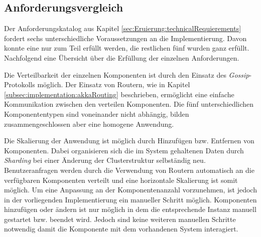 \subsection{Anforderungsvergleich}
Der Anforderungskatalog aus Kapitel \ref{sec:Eruierung:technicalRequierements} fordert sechs unterschiedliche Voraussetzungen an die Implementierung. Davon konnte eine nur zum Teil erfüllt werden, die restlichen fünf wurden ganz erfüllt. \\
Nachfolgend eine Übersicht über die Erfüllung der einzelnen Anforderungen.
\begin{enumerate}
    Die Verteilbarkeit der einzelnen Komponenten ist durch den Einsatz des \textit{Gossip}-Protokolls möglich. Der Einsatz von Routern, wie in Kapitel \ref{subsec:implementation:akkaRouting} beschrieben, ermöglicht eine einfache Kommunikation  zwischen den verteilen Komponenten. Die fünf unterschiedlichen Komponententypen sind voneinander nicht abhängig, bilden zusammengeschlossen aber eine homogene Anwendung.

    Die Skalierung der Anwendung ist möglich durch Hinzufügen bzw. Entfernen von Komponenten. Dabei organisieren sich die im System gehaltenen Daten durch \textit{Sharding} bei einer Änderung der Clusterstruktur selbständig neu. Benutzeranfragen werden durch die Verwendung von Routern automatisch an die verfügbaren Komponenten verteilt und eine horizontale Skalierung ist somit möglich. Um eine Anpassung an der Komponentenanzahl vorzunehmen, ist jedoch in der vorliegenden Implementierung ein manueller Schritt möglich. Komponenten hinzufügen oder ändern ist nur möglich in dem die entsprechende Instanz manuell gestartet bzw. beendet wird. Jedoch sind keine weiteren manuellen Schritte notwendig damit die Komponente mit dem vorhandenen System interagiert. 
% 
% 
% 
% 


\end{enumerate}
